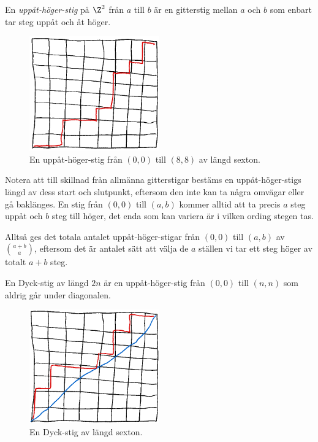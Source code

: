 \documentclass[nobib]{tufte-handout}
\begin{document}
\begin{definition}
    En \emph{uppåt-höger-stig} på $\Z^2$ från $a$ till $b$ är en gitterstig mellan $a$ och $b$ som enbart tar steg uppåt och åt höger.
    \begin{figure}[h]
        \centering
        \includegraphics[width=0.5\textwidth]{graphics/right_up_lattice_path.png}
        \caption{En uppåt-höger-stig från $(0,0)$ till $(8,8)$ av längd sexton.}
    \end{figure}
\end{definition}

Notera att till skillnad från allmänna gitterstigar bestäms en uppåt-höger-stigs längd av dess start och slutpunkt, eftersom den inte kan ta några omvägar eller gå baklänges. En stig från $(0,0)$ till $(a,b)$ kommer alltid att ta precis $a$ steg uppåt och $b$ steg till höger, det enda som kan variera är i vilken ording stegen tas.

Alltså ges det totala antalet uppåt-höger-stigar från $(0,0)$ till $(a,b)$ av $\binom{a+b}{a}$, eftersom det är antalet sätt att välja de $a$ ställen vi tar ett steg höger av totalt $a+b$ steg.

\begin{definition}
    En Dyck-stig av längd $2n$ är en uppåt-höger-stig från $(0,0)$ till $(n,n)$ som aldrig går under diagonalen.
    \begin{figure}
        \centering
        \includegraphics*[width=0.5\textwidth]{graphics/Dyck_path.png}
        \caption{En Dyck-stig av längd sexton.}
    \end{figure}
\end{definition}
\end{document}
